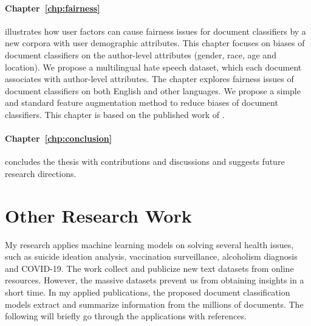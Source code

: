 \paragraph{Chapter~\ref{chp:fairness}} illustrates how user factors can cause fairness issues for document classifiers by a new corpora with user demographic attributes. This chapter focuses on biases of document classifiers on the author-level attributes (gender, race, age and location). We propose a multilingual hate speech dataset, which each document associates with author-level attributes. The chapter explores fairness issues of document classifiers on both English and other languages. We propose a simple and standard feature augmentation method to reduce biases of document classifiers. 
This chapter is based on the published work of \cite{huang2020multilingual}.


\paragraph{Chapter~\ref{chp:conclusion}} concludes the thesis with contributions and discussions and suggests future research directions.

\section{Other Research Work}

My research applies machine learning models on solving several health issues, such as suicide ideation analysis, vaccination surveillance, alcoholism diagnosis and COVID-19. 
The work collect and publicize new text datasets from online resources. 
However, the massive datasets prevent us from obtaining insights in a short time.
In my applied publications, the proposed document classification models extract and summarize information from the millions of documents. 
The following will briefly go through the applications with references.

